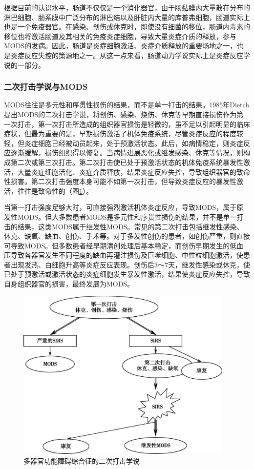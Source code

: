 根据目前的认识水平，肠道不仅仅是一个消化器官，由于肠黏膜内大量散在分布的淋巴细胞、肠系膜中广泛分布的淋巴结以及肝脏内大量的库普弗细胞，肠道实际上也是一个免疫器官。在感染、创伤或休克时，即使没有细菌的移位，肠道内毒素的移位也将激活肠道及其相关的免疫炎症细胞，导致大量炎症介质的释放，参与MODS的发病。因此，肠道是炎症细胞激活、炎症介质释放的重要场地之一，也是炎症反应失控的策源地之一。从这一点来看，肠道动力学说实际上是炎症反应学说的一部分。

\subsubsection{二次打击学说与MODS}

MODS往往是多元性和序贯性损伤的结果，而不是单一打击的结果。1985年Dietch提出MODS的二次打击学说，将创伤、感染、烧伤、休克等早期直接损伤作为第一次打击，第一次打击所造成的组织器官损伤是轻微的，虽不足以引起明显的临床症状，但最为重要的是，早期损伤激活了机体免疫系统，尽管炎症反应的程度较轻，但炎症细胞已经被动员起来，处于预激活状态。此后，如病情稳定，则炎症反应逐渐缓解，损伤组织得以修复。当病情进展恶化或继发感染、休克等情况，则构成第二次或第三次打击。第二次打击使已处于预激活状态的机体免疫系统暴发性激活，大量炎症细胞活化、炎症介质释放，结果炎症反应失控，导致组织器官的致命性损害。第二次打击强度本身可能不如第一次打击，但导致炎症反应的暴发性激活，往往是致命性的（图\ref{fig35-3}）。

当第一打击强度足够大时，可直接强烈激活机体炎症反应，导致MODS，属于原发性MODS。但大多数患者MODS是多元性和序贯性损伤的结果，并不是单一打击的结果，这类MODS属于继发性MODS。常见的第二次打击包括继发性感染、休克、缺氧、缺血、创伤、手术等。对于多发性创伤的患者，如创伤严重，则直接可导致MODS。但多数患者经早期清创处理后基本稳定，而创伤早期发生的低血压导致各器官发生不同程度的缺血再灌注损伤及巨噬细胞、中性粒细胞激活，使患者出现发热、白细胞升高等炎症反应表现。创伤后3～7天，继发性感染或休克，使已处于预激活或激活状态的炎症细胞发生暴发性激活，结果使炎症反应失控，导致自身组织器官的损害，最终发展为MODS。

\begin{figure}[!htbp]
 \centering
 \includegraphics[width=4.23958in,height=3.38542in]{./images/Image00134.jpg}
 \captionsetup{justification=centering}
 \caption{多器官功能障碍综合征的二次打击学说}
 \label{fig35-3}
  \end{figure} 

